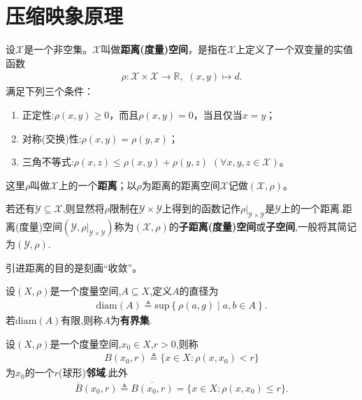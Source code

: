 \documentclass[../../main.tex]{subfiles}%
\begin{document}
\section{压缩映象原理}

\begin{definition}
设$\mathscr{X}$是一个非空集。$\mathscr{X}$叫做\textbf{距离(度量)空间}，是指在$\mathscr{X}$上定义了一个双变量的实值函数
\begin{align*}
\rho:\mathscr{X}\times \mathscr{X}\to \mathbb{R},\,\,(x,y)\mapsto d.
\end{align*}
满足下列三个条件：
\begin{enumerate}[(1)]
\item 正定性:$\rho(x,y)\geqslant 0$，而且$\rho(x,y)=0$，当且仅当$x=y$；
\item 对称(交换)性:$\rho(x,y)=\rho(y,x)$；
\item 三角不等式:$\rho(x,z)\leqslant \rho(x,y)+\rho(y,z)$ $(\forall x,y,z\in \mathscr{X})$。
\end{enumerate}
这里$\rho$叫做$\mathscr{X}$上的一个\textbf{距离}；以$\rho$为距离的距离空间$\mathscr{X}$记做$(\mathscr{X},\rho)$。

若还有$\mathscr{Y}\subseteq \mathscr{X}$,则显然将$\rho$限制在$\mathscr{Y}\times \mathscr{Y}$上得到的函数记作$\rho|_{\mathscr{Y}\times \mathscr{Y}}$是$\mathscr{Y}$上的一个距离.距离(度量)空间$(\mathscr{Y},\rho|_{\mathscr{Y}\times \mathscr{Y}})$称为$(\mathscr{X},\rho)$的\textbf{子距离(度量)空间}或\textbf{子空间},一般将其简记为$(\mathscr{Y},\rho)$.
\end{definition}
\begin{remark}
引进距离的目的是刻画“收敛”。
\end{remark}

\begin{definition}
设$(X,\rho)$是一个度量空间,$A\subseteq X$,定义$A$的直径为
\begin{align*}
\text{diam}(A)\triangleq \mathrm{sup}\left\{ \rho \left( a,g \right) \mid a,b\in A \right\} .
\end{align*}
若$\text{diam}(A)$有限,则称$A$为\textbf{有界集}.
\end{definition}

\begin{definition}
设$(X,\rho)$是一个度量空间,$x_0\in X$,$r>0$,则称
\begin{align*}
B(x_0,r)\triangleq \{x\in X: \rho(x,x_0)<r\}
\end{align*}
为$x_0$的一个$r$(球形)\textbf{邻域}.此外
\begin{align*}
\overline{B}(x_0,r)\triangleq \overline{B(x_0,r)}=\{x\in X: \rho(x,x_0)\leqslant r\}.
\end{align*}
\end{definition}
\end{document}
